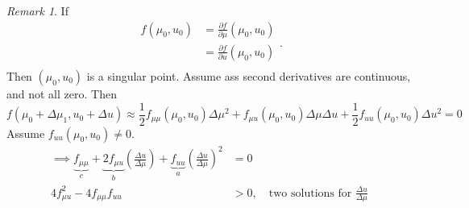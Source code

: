 \documentclass{article}
\theoremstyle{remark}
\newtheorem*{remark}{Remark}
\begin{document}
 
\begin{remark}
  If \[
  \begin{split}
    f\left( \mu _{0}, u_{0} \right) &=  \frac{\partial f}{\partial \mu } \left( \mu _{0}, u_{0} \right) \\
    &=  \frac{\partial f}{\partial u}  \left( \mu _{0}, u_{0} \right) \\
  \end{split} .
  \] 
  Then $\left( \mu _{0}, u_{0} \right)$ is a singular point. Assume ass second derivatives are continuous, and not all zero. Then \[
  f\left( \mu _{0} + \Delta \mu _{1}, u_{0} + \Delta  u \right) \approx \frac{1}{2} f_{\mu \mu } \left( \mu _{0}, u_{0} \right) \Delta \mu ^2 + f_{\mu u } \left( \mu _{0}, u_{0} \right) \Delta \mu  \Delta u + \frac{1}{2} f_{uu} \left( \mu _{0} ,u_{0} \right) \Delta u^2 = 0
  \] 
  Assume $f_{uu}\left( \mu _{0} , u_{0} \right) \neq 0$. \[
    \begin{split}
  \implies  \underbrace{f_{\mu \mu }}_{c}  + \underbrace{2 f_{\mu u}}_{b}  \left( \frac{\Delta u}{\Delta \mu }  \right) + \underbrace{f_{uu}}_{a}  \left( \frac{\Delta u}{\Delta \mu }  \right)^2 &=  0 \\
   4 f^2_{\mu u}  - 4 f_{\mu \mu }f_{uu}   &  > 0, \quad \text{two solutions for } \frac{\Delta u}{\Delta \mu }   \\
    \end{split} 
  \] 
\end{remark}
 
\end{document}
